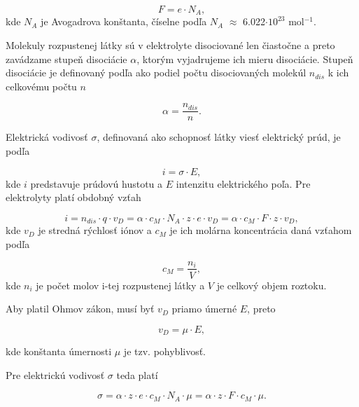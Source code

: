 \documentclass{article}
\begin{document}
\begin{equation}
    F = e{\cdot}N_A,
\end{equation}
kde $N_A$ je Avogadrova konštanta, číselne podľa \cite{avo} $N_A$ $\approx$ 6.022$\cdot$$10^{23}$ mol$^{-1}$.

Molekuly rozpustenej látky sú v elektrolyte disociované len čiastočne a preto zavádzame stupeň disociácie $\alpha$, ktorým vyjadrujeme ich mieru disociácie. Stupeň disociácie je definovaný podľa \cite{prak} ako podiel počtu disociovaných molekúl $n_{dis}$ k ich celkovému počtu $n$

\begin{equation}
    \alpha = \frac{n_{dis}}{n}.
\end{equation}

Elektrická vodivosť $\sigma$, definovaná ako schopnosť látky viesť elektrický prúd, je podľa \cite{prak} 

\begin{equation} \label{}
    i = \sigma{\cdot}E,    
\end{equation}
kde $i$ predstavuje prúdovú hustotu a $E$ intenzitu elektrického poľa. Pre elektrolyty platí obdobný vzťah \cite{prak}

\begin{equation}
    i = n_{dis}{\cdot}q{\cdot}v_D = \alpha{\cdot}c_M{\cdot}N_A{\cdot}z{\cdot}e{\cdot}v_D = \alpha{\cdot}c_M{\cdot}F{\cdot}z{\cdot}v_D,
\end{equation}
kde $v_D$ je stredná rýchlosť iónov a $c_M$ je ich molárna koncentrácia daná vzťahom podľa \cite{prak}

\begin{equation}
    c_M = \frac{n_i}{V},
\end{equation}
kde $n_i$ je počet molov i-tej rozpustenej látky a $V$ je celkový objem roztoku.

Aby platil Ohmov zákon, musí byť $v_D$ priamo úmerné $E$, preto \cite{prak}

\begin{equation}
    v_D = \mu{\cdot}E,
\end{equation}

kde konštanta úmernosti $\mu$ je tzv. pohyblivosť.

Pre elektrickú vodivosť $\sigma$ teda platí \cite{prak}

\begin{equation}
    \sigma = \alpha{\cdot}z{\cdot}e{\cdot}c_M{\cdot}N_A{\cdot}\mu = \alpha{\cdot}z{\cdot}F{\cdot}c_M{\cdot}{\mu}.
\end{equation}
\end{document}
